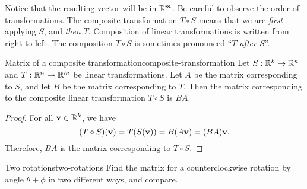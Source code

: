 Notice that the resulting vector will be in $\mathbb{R}^m$. Be careful to
observe the order of transformations. The composite transformation
$T\circ S$ means that we are {\em first} applying $S$, and {\em then}
$T$. Composition of linear transformations is written from right to
left. The composition $T\circ S$ is sometimes pronounced ``{\em $T$
  after $S$}''.

\begin{theorem}{Matrix of a composite transformation}{composite-transformation}
  Let $S: \mathbb{R}^k \to \mathbb{R}^n$ and $T: \mathbb{R}^n \to \mathbb{R}^m$ be linear
  transformations. Let $A$ be the matrix corresponding to $S$, and let
  $B$ be the matrix corresponding to $T$. Then the matrix
  corresponding to the composite linear transformation $T\circ S$ is
  $BA$.
\end{theorem}

\begin{proof}
  For all $\mbox{\bf v}\in\mathbb{R}^k$, we have
  \begin{equation*}
    (T\circ S)(\mbox{\bf v}) = T(S(\mbox{\bf v})) = B(A \mbox{\bf v}) = (BA) \mbox{\bf v}.
  \end{equation*}
  Therefore, $BA$ is the matrix corresponding to $T\circ S$.
\end{proof}

\begin{example}{Two rotations}{two-rotations}
  Find the matrix for a counterclockwise rotation%
   by angle
  $\theta+\phi$ in two different ways, and compare.
\end{example}

